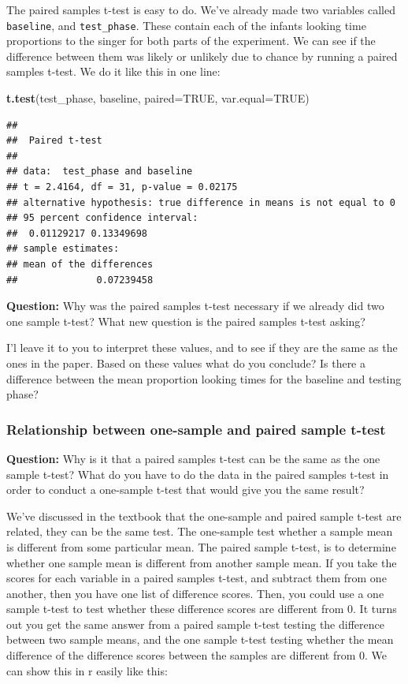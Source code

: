 \documentclass[]{book}
\newenvironment{Shaded}{\begin{snugshade}}{\end{snugshade}}
\newcommand{\KeywordTok}[1]{\textcolor[rgb]{0.13,0.29,0.53}{\textbf{{#1}}}}
\newcommand{\DataTypeTok}[1]{\textcolor[rgb]{0.13,0.29,0.53}{{#1}}}
\newcommand{\OtherTok}[1]{\textcolor[rgb]{0.56,0.35,0.01}{{#1}}}
\newcommand{\NormalTok}[1]{{#1}}
\theoremstyle{definition}
\theoremstyle{definition}
\theoremstyle{definition}
\theoremstyle{remark}
\begin{document}
The paired samples t-test is easy to do. We've already made two
variables called \texttt{baseline}, and \texttt{test\_phase}. These
contain each of the infants looking time proportions to the singer for
both parts of the experiment. We can see if the difference between them
was likely or unlikely due to chance by running a paired samples t-test.
We do it like this in one line:

\begin{Shaded}
\begin{Highlighting}[]
\KeywordTok{t.test}\NormalTok{(test_phase, baseline, }\DataTypeTok{paired=}\OtherTok{TRUE}\NormalTok{, }\DataTypeTok{var.equal=}\OtherTok{TRUE}\NormalTok{)}
\end{Highlighting}
\end{Shaded}

\begin{verbatim}
## 
##  Paired t-test
## 
## data:  test_phase and baseline
## t = 2.4164, df = 31, p-value = 0.02175
## alternative hypothesis: true difference in means is not equal to 0
## 95 percent confidence interval:
##  0.01129217 0.13349698
## sample estimates:
## mean of the differences 
##              0.07239458
\end{verbatim}

\textbf{Question:} Why was the paired samples t-test necessary if we
already did two one sample t-test? What new question is the paired
samples t-test asking?

I'l leave it to you to interpret these values, and to see if they are
the same as the ones in the paper. Based on these values what do you
conclude? Is there a difference between the mean proportion looking
times for the baseline and testing phase?

\subsubsection{Relationship between one-sample and paired sample
t-test}\label{relationship-between-one-sample-and-paired-sample-t-test}

\textbf{Question:} Why is it that a paired samples t-test can be the
same as the one sample t-test? What do you have to do the data in the
paired samples t-test in order to conduct a one-sample t-test that would
give you the same result?

We've discussed in the textbook that the one-sample and paired sample
t-test are related, they can be the same test. The one-sample test
whether a sample mean is different from some particular mean. The paired
sample t-test, is to determine whether one sample mean is different from
another sample mean. If you take the scores for each variable in a
paired samples t-test, and subtract them from one another, then you have
one list of difference scores. Then, you could use a one sample t-test
to test whether these difference scores are different from 0. It turns
out you get the same answer from a paired sample t-test testing the
difference between two sample means, and the one sample t-test testing
whether the mean difference of the difference scores between the samples
are different from 0. We can show this in r easily like this:
\end{document}
